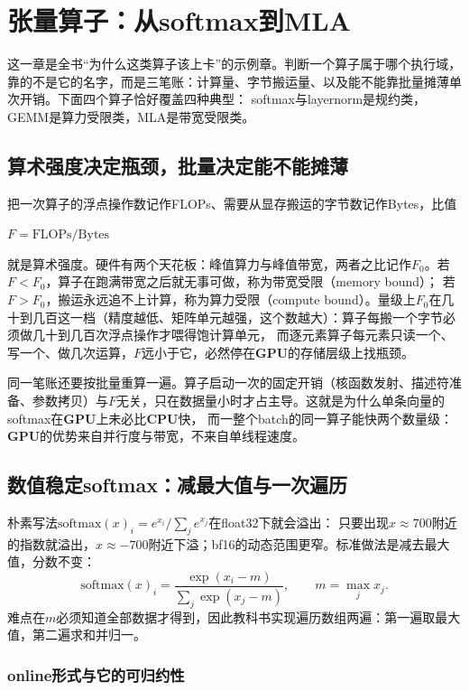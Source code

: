 \documentclass[12pt,a4paper,fontset=fandol]{ctexbook}
\newcommand{\Dom}[1]{\textsf{\bfseries #1}}
\newcommand{\CPU}{\Dom{CPU}}
\newcommand{\GPU}{\Dom{GPU}}
\begin{document}
\chapter{张量算子：从softmax到MLA}

这一章是全书``为什么这类算子该上卡''的示例章。判断一个算子属于哪个执行域，靠的不是它的名字，而是三笔账：计算量、字节搬运量、以及能不能靠批量摊薄单次开销。下面四个算子恰好覆盖四种典型：
softmax与layernorm是规约类，GEMM是算力受限类，MLA是带宽受限类。

\section{算术强度决定瓶颈，批量决定能不能摊薄}

把一次算子的浮点操作数记作FLOPs、需要从显存搬运的字节数记作Bytes，比值
\begin{center}
$F=\mathrm{FLOPs}/\mathrm{Bytes}$
\end{center}
就是算术强度。硬件有两个天花板：峰值算力与峰值带宽，两者之比记作$F_0$。若$F<F_0$，算子在跑满带宽之后就无事可做，称为带宽受限（memory bound）；
若$F>F_0$，搬运永远追不上计算，称为算力受限（compute bound）。量级上$F_0$在几十到几百这一档（精度越低、矩阵单元越强，这个数越大）：算子每搬一个字节必须做几十到几百次浮点操作才喂得饱计算单元，
而逐元素算子每元素只读一个、写一个、做几次运算，$F$远小于它，必然停在\GPU{}的存储层级上找瓶颈。

同一笔账还要按批量重算一遍。算子启动一次的固定开销（核函数发射、描述符准备、参数拷贝）与$F$无关，只在数据量小时才占主导。这就是为什么单条向量的softmax在\GPU{}上未必比\CPU{}快，
而一整个batch的同一算子能快两个数量级：\GPU{}的优势来自并行度与带宽，不来自单线程速度。

\section{数值稳定softmax：减最大值与一次遍历}

朴素写法$\mathrm{softmax}(x)_i=e^{x_i}/\sum_je^{x_j}$在float32下就会溢出：
只要出现$x\approx700$附近的指数就溢出，$x\approx-700$附近下溢；bf16的动态范围更窄。标准做法是减去最大值，分数不变：
\begin{equation}
\mathrm{softmax}(x)_i=\frac{\exp(x_i-m)}{\sum_j\exp(x_j-m)},\qquad
m=\max_j x_j .
\end{equation}
难点在$m$必须知道全部数据才得到，因此教科书实现遍历数组两遍：第一遍取最大值，第二遍求和并归一。

\subsection{online形式与它的可归约性}
\end{document}
